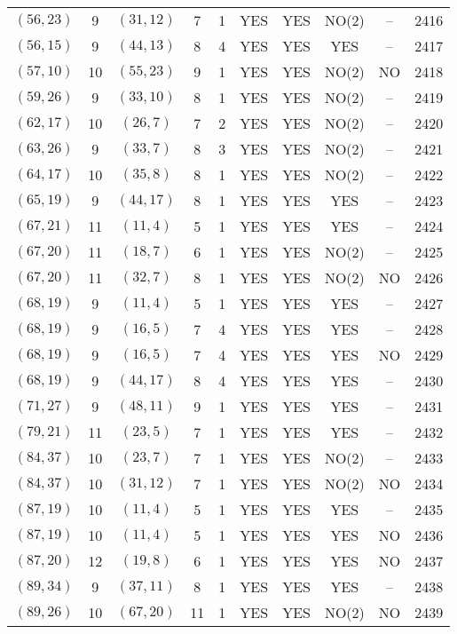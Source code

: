 \begin{longtable}{|c|c|c|c|c|c|c|c|c|c|}
$(56, 23)$ & 9 & $(31, 12)$ & 7 & 1 & YES & YES & NO(2) & -- & 2416\\
$(56, 15)$ & 9 & $(44, 13)$ & 8 & 4 & YES & YES & YES & -- & 2417\\
$(57, 10)$ & 10 & $(55, 23)$ & 9 & 1 & YES & YES & NO(2) & NO & 2418\\
$(59, 26)$ & 9 & $(33, 10)$ & 8 & 1 & YES & YES & NO(2) & -- & 2419\\
$(62, 17)$ & 10 & $(26, 7)$ & 7 & 2 & YES & YES & NO(2) & -- & 2420\\
$(63, 26)$ & 9 & $(33, 7)$ & 8 & 3 & YES & YES & NO(2) & -- & 2421\\
$(64, 17)$ & 10 & $(35, 8)$ & 8 & 1 & YES & YES & NO(2) & -- & 2422\\
$(65, 19)$ & 9 & $(44, 17)$ & 8 & 1 & YES & YES & YES & -- & 2423\\
$(67, 21)$ & 11 & $(11, 4)$ & 5 & 1 & YES & YES & YES & -- & 2424\\
$(67, 20)$ & 11 & $(18, 7)$ & 6 & 1 & YES & YES & NO(2) & -- & 2425\\
$(67, 20)$ & 11 & $(32, 7)$ & 8 & 1 & YES & YES & NO(2) & NO & 2426\\
$(68, 19)$ & 9 & $(11, 4)$ & 5 & 1 & YES & YES & YES & -- & 2427\\
$(68, 19)$ & 9 & $(16, 5)$ & 7 & 4 & YES & YES & YES & -- & 2428\\
$(68, 19)$ & 9 & $(16, 5)$ & 7 & 4 & YES & YES & YES & NO & 2429\\
$(68, 19)$ & 9 & $(44, 17)$ & 8 & 4 & YES & YES & YES & -- & 2430\\
$(71, 27)$ & 9 & $(48, 11)$ & 9 & 1 & YES & YES & YES & -- & 2431\\
$(79, 21)$ & 11 & $(23, 5)$ & 7 & 1 & YES & YES & YES & -- & 2432\\
$(84, 37)$ & 10 & $(23, 7)$ & 7 & 1 & YES & YES & NO(2) & -- & 2433\\
$(84, 37)$ & 10 & $(31, 12)$ & 7 & 1 & YES & YES & NO(2) & NO & 2434\\
$(87, 19)$ & 10 & $(11, 4)$ & 5 & 1 & YES & YES & YES & -- & 2435\\
$(87, 19)$ & 10 & $(11, 4)$ & 5 & 1 & YES & YES & YES & NO & 2436\\
$(87, 20)$ & 12 & $(19, 8)$ & 6 & 1 & YES & YES & YES & NO & 2437\\
$(89, 34)$ & 9 & $(37, 11)$ & 8 & 1 & YES & YES & YES & -- & 2438\\
$(89, 26)$ & 10 & $(67, 20)$ & 11 & 1 & YES & YES & NO(2) & NO & 2439\\

\end{longtable}
